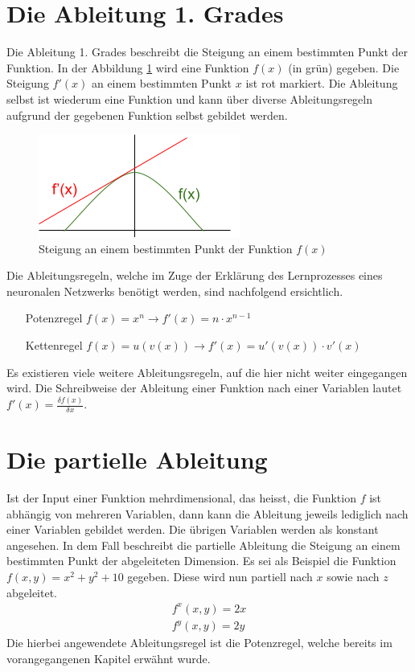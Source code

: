 \section{Die Ableitung 1. Grades}
Die Ableitung 1. Grades beschreibt die Steigung an einem bestimmten Punkt der Funktion. In der Abbildung \ref{fig:00_steigung_an_punkt}
wird eine Funktion $f(x)$ (in grün) gegeben. Die Steigung $f'(x)$ an einem bestimmten Punkt $x$ ist rot markiert.
Die Ableitung selbst ist wiederum eine Funktion und kann über diverse Ableitungsregeln aufgrund der gegebenen Funktion
selbst gebildet werden.
\begin{figure}[h!]
    \begin{center}
        \includegraphics[width=0.25\linewidth]{../common/02_appendix/00_resources/00_derivation.png}
    \end{center}
    \caption{Steigung an einem bestimmten Punkt der Funktion $f(x)$}
    \label{fig:00_steigung_an_punkt}
\end{figure}

Die Ableitungsregeln, welche im Zuge der Erklärung des Lernprozesses eines neuronalen Netzwerks benötigt werden,
sind nachfolgend ersichtlich.
\begin{itemize}
    \item[Potenzregel] $f(x) = x^n \longrightarrow f'(x) = n \cdot x^{n-1}$\label{abl:potenzregel}
    \item[Kettenregel] $f(x) = u(v(x)) \longrightarrow f'(x) = u'(v(x)) \cdot v'(x)$\label{abl:kettenregel}
\end{itemize}
Es existieren viele weitere Ableitungsregeln, auf die hier nicht weiter eingegangen wird.
Die Schreibweise der Ableitung einer Funktion nach einer Variablen lautet $f'(x) = \frac{\delta f(x)}{\delta x}$.

\section{Die partielle Ableitung}
Ist der Input einer Funktion mehrdimensional, das heisst, die Funktion $f$ ist abhängig von mehreren Variablen, dann
kann die Ableitung jeweils lediglich nach einer Variablen gebildet werden. Die übrigen Variablen werden als konstant
angesehen. In dem Fall beschreibt die partielle Ableitung die Steigung an einem bestimmten Punkt der abgeleiteten
Dimension. Es sei als Beispiel die Funktion $f(x, y) = x^2 + y^2 + 10$ gegeben. Diese wird nun partiell nach $x$ sowie
nach $z$ abgeleitet.
\begin{align}
    f^x(x, y) = 2x\\
    f^y(x, y) = 2y
\end{align}
Die hierbei angewendete Ableitungsregel ist die Potenzregel, welche bereits im vorangegangenen Kapitel erwähnt wurde.

